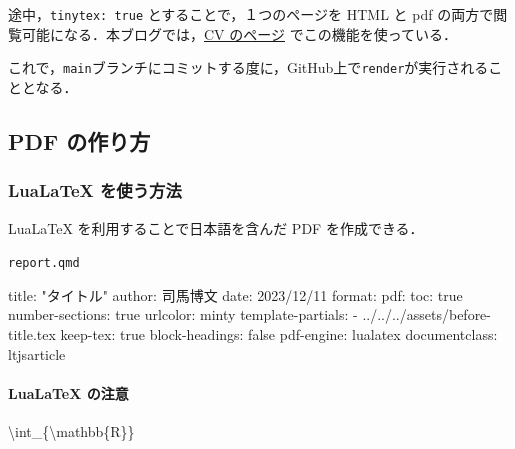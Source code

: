 \documentclass[
]{ltjsarticle}
\newenvironment{Shaded}{\begin{snugshade}}{\end{snugshade}}
\newcommand{\FunctionTok}[1]{\textcolor[rgb]{0.28,0.35,0.67}{#1}}
\newcommand{\NormalTok}[1]{\textcolor[rgb]{0.00,0.23,0.31}{#1}}
\begin{document}
途中，\texttt{tinytex:\ true} とすることで，１つのページを HTML と pdf
の両方で閲覧可能になる．本ブログでは，\href{https://162348.github.io/static/CV/cv.html}{CV
のページ} でこの機能を使っている．

これで，\texttt{main}ブランチにコミットする度に，GitHub上で\texttt{render}が実行されることとなる．

\subsection{PDF の作り方}\label{pdf-ux306eux4f5cux308aux65b9}

\subsubsection{LuaLaTeX
を使う方法}\label{lualatex-ux3092ux4f7fux3046ux65b9ux6cd5}

LuaLaTeX を利用することで日本語を含んだ PDF を作成できる．

\begin{codelisting}

\caption{\texttt{report.qmd}}

\begin{Shaded}
\begin{Highlighting}[]
\NormalTok{title: "タイトル"}
\NormalTok{author: 司馬博文}
\NormalTok{date: 2023/12/11}
\NormalTok{format:}
\NormalTok{  pdf:}
\NormalTok{    toc: true}
\NormalTok{    number{-}sections: true}
\NormalTok{    urlcolor: minty}
\NormalTok{    template{-}partials: }
\NormalTok{      {-} ../../../assets/before{-}title.tex}
\NormalTok{    keep{-}tex: true}
\NormalTok{    block{-}headings: false}
\NormalTok{    pdf{-}engine: lualatex}
\NormalTok{    documentclass: ltjsarticle}
\end{Highlighting}
\end{Shaded}

\end{codelisting}

\paragraph{LuaLaTeX の注意}\label{lualatex-ux306eux6ce8ux610f}

\begin{Shaded}
\begin{Highlighting}[]
\FunctionTok{\textbackslash{}int}\NormalTok{\_\{}\FunctionTok{\textbackslash{}mathbb}\NormalTok{\{R\}\}}
\end{Highlighting}
\end{Shaded}
\end{document}
